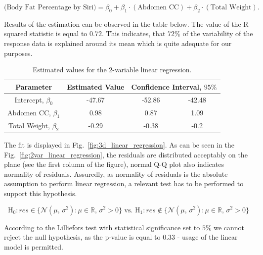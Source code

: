 \documentclass[11pt,american,american]{article}
\begin{document}
\begin{equation*}
	\text{(Body Fat Percentage by Siri)} = \beta_{0} + \beta_{1} \cdot (\text{Abdomen CC}) + \beta_{2} \cdot (\text{Total Weight}).
\end{equation*}

\medskip

Results of the estimation can be observed in the table below. The value of the R-squared statistic is equal to $0.72$. This indicates, that $72\%$ of the variability of the response data is explained around its mean which is quite adequate for our purposes. 

\begin{table}[H]
	\centering
	\begin{tabular}{|c||c||c|c|}
		\hline 
		Parameter &  Estimated Value & \multicolumn{2}{c|}{Confidence Interval, $95\%$}  \\ 
		\hline \hline 
		Intercept, $\beta_{0}$ & -47.67 & -52.86 &  -42.48 \\ 
		\hline 
		Abdomen CC, $\beta_{1}$ & 0.98 & 0.87 &  1.09 \\ 
		\hline 
		Total Weight, $\beta_{2}$ & -0.29 & -0.38 & -0.2 \\ 
		\hline 
	\end{tabular} 
\caption{Estimated values for the 2-variable linear regression.}
\end{table}

The fit is displayed in Fig.~\ref{fig:3d_linear_regression}. As can be seen in the Fig.~\ref{fig:2var_linear_regression}, the residuals are distributed acceptably on the plane (see the first column of the figure), normal Q-Q plot also indicates normality of residuals. Assuredly, as normality of residuals is the absolute assumption to perform linear regression, a relevant test has to be performed to support this hypothesis.

\begin{equation*}
	\text{H}_{0}: res \in \{ \mathcal{N} (\mu,\,\sigma^{2}): \mu \in \mathbb{R}, \, \sigma^{2} > 0 \} \text{ vs. }
	\text{H}_{1}: res \not\in \{ \mathcal{N} (\mu,\,\sigma^{2}): \mu \in \mathbb{R}, \, \sigma^{2} > 0 \}
\end{equation*}

\medskip

According to the Lilliefors test with statistical significance set to $5\%$ we cannot reject the null hypothesis, as the p-value is equal to $0.33$ - usage of the linear model is permitted.

\newpage
\end{document}
